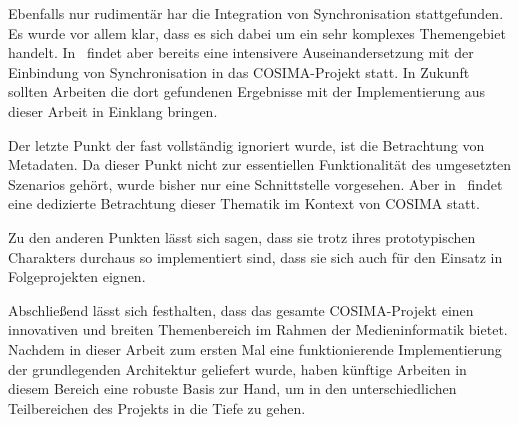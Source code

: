   Ebenfalls nur rudimentär har die Integration von Synchronisation stattgefunden. Es wurde vor allem klar, dass es sich dabei um ein sehr komplexes Themengebiet handelt. In~\citep{antons09} findet aber bereits eine intensivere Auseinandersetzung mit der Einbindung von Synchronisation in das COSIMA-Projekt statt. In Zukunft sollten Arbeiten die dort gefundenen Ergebnisse mit der Implementierung aus dieser Arbeit in Einklang bringen.
  
  Der letzte Punkt der fast vollständig ignoriert wurde, ist die Betrachtung von Metadaten. Da dieser Punkt nicht zur essentiellen Funktionalität des umgesetzten Szenarios gehört, wurde bisher nur eine Schnittstelle vorgesehen. Aber in~\citep{lehmann09} findet eine dedizierte Betrachtung dieser Thematik im Kontext von COSIMA statt.
  
  Zu den anderen Punkten lässt sich sagen, dass sie trotz ihres prototypischen Charakters durchaus so implementiert sind, dass sie sich auch für den Einsatz in Folgeprojekten eignen.
  
  Abschließend lässt sich festhalten, dass das gesamte COSIMA-Projekt einen innovativen und breiten Themenbereich im Rahmen der Medieninformatik bietet. Nachdem in dieser Arbeit zum ersten Mal eine funktionierende Implementierung der grundlegenden Architektur geliefert wurde, haben künftige Arbeiten in diesem Bereich eine robuste Basis zur Hand, um in den unterschiedlichen Teilbereichen des Projekts in die Tiefe zu gehen.


